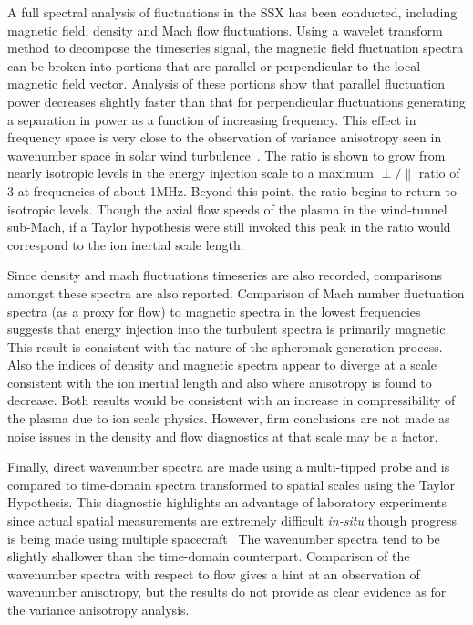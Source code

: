 \documentclass[aip,prl,amsmath,amssymb,reprint,superscriptaddress]{revtex4-1} %
\begin{document}
A full spectral analysis of fluctuations in the SSX has been conducted, including magnetic field, density and Mach flow fluctuations. Using a wavelet transform method to decompose the timeseries signal, the magnetic field fluctuation spectra can be broken into portions that are parallel or perpendicular to the local magnetic field vector. Analysis of these portions show that parallel fluctuation power decreases slightly faster than that for perpendicular fluctuations generating a separation in power as a function of increasing frequency. This effect in frequency space is very close to the observation of variance anisotropy seen in wavenumber space in solar wind turbulence~\cite{kiyani13}. The ratio is shown to grow from nearly isotropic levels in the energy injection scale to a maximum $\perp/\parallel$ ratio of 3 at frequencies of about 1MHz. Beyond this point, the ratio begins to return to isotropic levels. Though the axial flow speeds of the plasma in the wind-tunnel sub-Mach, if a Taylor hypothesis were still invoked this peak in the ratio would correspond to the ion inertial scale length. 

Since density and mach fluctuations timeseries are also recorded, comparisons amongst these spectra are also reported. Comparison of Mach number fluctuation spectra (as a proxy for flow) to magnetic spectra in the lowest frequencies suggests that energy injection into the turbulent spectra is primarily magnetic. This result is consistent with the nature of the spheromak generation process. Also the indices of density and magnetic spectra appear to diverge at a scale consistent with the ion inertial length and also where anisotropy is found to decrease. Both results would be consistent with an increase in compressibility of the plasma due to ion scale physics. However, firm conclusions are not made as noise issues in the density and flow diagnostics at that scale may be a factor.

Finally, direct wavenumber spectra are made using a multi-tipped probe and is compared to time-domain spectra transformed to spatial scales using the Taylor Hypothesis. This diagnostic highlights an advantage of laboratory experiments since actual spatial measurements are extremely difficult {\it in-situ} though progress is being made using multiple spacecraft~\cite{sahraoui10}  The wavenumber spectra tend to be slightly shallower than the time-domain counterpart. Comparison of the wavenumber spectra with respect to flow gives a hint at an observation of wavenumber anisotropy, but the results do not provide as clear evidence as for the variance anisotropy analysis.
\end{document}
